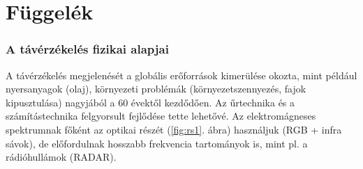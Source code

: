 \documentclass[a4paper,12pt]{article}
\begin{document}
\newpage

%
%
%
%

\part{Függelék}

\setcounter{section}{0}

\section{A távérzékelés fizikai alapjai} \label{remotesensing_desc}

A távérzékelés megjelenését a globális erőforrások kimerülése okozta, mint például nyersanyagok (olaj), környezeti problémák (környezetszennyezés, fajok kipusztulása)  nagyjából a 60 évektől kezdődően. Az űrtechnika és a számítástechnika felgyorsult fejlődése tette lehetővé. Az elektromágneses spektrumnak főként az optikai részét (\ref{fig:rs1}. ábra) használjuk (RGB + infra sávok), de előfordulnak hosszabb frekvencia tartományok is, mint pl. a rádióhullámok (RADAR). 
\end{document}

